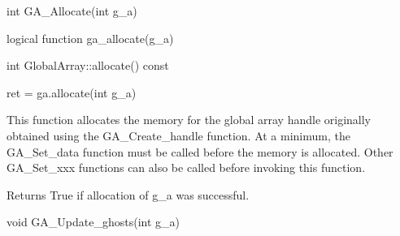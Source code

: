 \documentclass[10pt]{article}
\begin{document}

\begin{capi}
\begin{ccode}
int GA_Allocate(int g_a)
\end{ccode}
\begin{funcargs}
\end{funcargs}
\end{capi}

\begin{fapi}
\begin{fcode}
logical function ga_allocate(g_a)
\end{fcode}
\begin{funcargs}
\end{funcargs}
\end{fapi}

\begin{cxxapi}
\begin{cxxcode}
int GlobalArray::allocate() const
\end{cxxcode}
\end{cxxapi}

\begin{pyapi}
\begin{pycode}
ret = ga.allocate(int g_a)
\end{pycode}
\begin{funcargs}
\end{funcargs}
\end{pyapi}

\gcoll

\begin{desc}

This function allocates the memory for the global array handle originally
obtained using the GA_Create_handle function. At a minimum, the GA_Set_data
function must be called before the memory is allocated. Other GA_Set_xxx
functions can also be called before invoking this function.

Returns True if allocation of g_a was successful.

\end{desc}


\begin{capi}
\begin{ccode}
void GA_Update_ghosts(int g_a)
\end{ccode}
\begin{funcargs}
\end{funcargs}
\end{capi}
\end{document}
